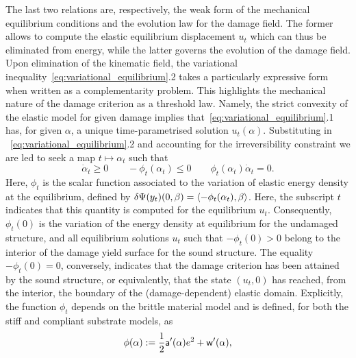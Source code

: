 The last two relations are, respectively, the weak form of the mechanical equilibrium conditions and the  evolution law  for the damage field.
The former allows to compute the elastic equilibrium displacement $u_t$ which can thus be eliminated from energy, while the latter governs the evolution of the damage field.
Upon elimination of the kinematic field, the variational inequality~\eqref{eq:variational_equilibrium}.2 takes a particularly expressive form when written as a complementarity problem. This highlights the mechanical nature of the damage criterion as a threshold law.
Namely, the strict convexity of the elastic model for given damage implies that~\eqref{eq:variational_equilibrium}.1 has, for given $\alpha$, a unique time-parametrised solution $u_t(\alpha)$. 
Substituting in ~\eqref{eq:variational_equilibrium}.2 and accounting for the irreversibility constraint we are led to seek a map $t\mapsto\alpha_t$ such that 
    \begin{equation}
    \label{eq:complementarity}
    \dot \alpha_t \geq 0 \qquad 
     -\phi_t(\alpha_t) \leq 0 \qquad
     \phi_t(\alpha_t)\dot \alpha_t = 0.
\end{equation}
Here, $\phi_t$ is the scalar function associated to the variation of elastic energy density at the equilibrium, defined by $\delta \Psi(y_t)(0, \beta) = \langle -\phi_t(\alpha_t), \beta\rangle$. Here, the subscript $t$ indicates that this quantity is computed for the equilibrium $u_t$.
Consequently, $\phi_t(0)$ is 
the variation of the  energy density at equilibrium for the undamaged structure, and all equilibrium solutions $u_t$ such that $-\phi_t(0) > 0$ belong to the interior of the damage yield surface for the sound structure. The equality $-\phi_t(0) = 0$, conversely, indicates that the damage criterion has been attained by the sound structure, or equivalently, that the state $(u_t, 0)$ has reached, from the interior, the boundary of the (damage-dependent) elastic domain. 
% 
% 
% 
Explicitly, the function $\phi_t$ depends on the brittle material model and is defined, for both the stiff and compliant substrate models, as
\begin{equation}
    \label{eq:energy_release_rate}
    \phi(\alpha) := \frac{1}{2}\mathsf{a}'(\alpha)e^2 + \mathsf{w}'(\alpha),
\end{equation}
